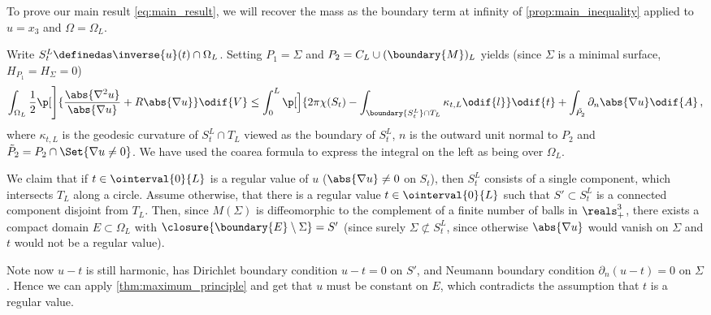 \documentclass[titlepage,numbers=noenddot,oneside,%
cleardoublepage=empty,paper=a4,fontsize=11pt,%
english,%
]{scrartcl}
\newcommand*{\mathcomma}{\,,}
\begin{document}
\newcommand{\nonzeroboundary}{\partial_{\neq 0}M^L}\newcommand{\maxu}{\bar{u}}
\newcommand{\minu}{\underline{u}}
To prove our main result \cref{eq:main_result}, we will recover the mass as the boundary term at infinity of \cref{prop:main_inequality} applied to \( u=x_3 \) and \( \Omega=\Omega_L \).


Write \( S_t^L\definedas \inverse{u}(t)\cap \Omega_L \). Setting \( P_1=\Sigma\) and \( P_2=C_L\cup (\boundary{M})_L \) yields (since \( \Sigma \) is a minimal surface, \ie \( H_{P_1}=H_\Sigma=0 \))
\begin{equation}
    \int_{\Omega_L} \frac{1}{2}\p[\Bigg]{\frac{\abs{\nabla^2 u}}{\abs{\nabla u}}+R\abs{\nabla u} }\odif{V} \leq\int_{0}^{L}\p[\Big]{2\pi \chi(S_t)-\int _{\boundary{S_t^L} \cap T_L}\kappa_{t,L}\odif{l}}\odif{t}+ \int_{\tilde{P_2}}\partial_{n} \abs{\nabla u}\odif{A}\mathcomma\label{eq:just_insert_cylinder_into_main_inequality}
\end{equation}
where \( \kappa_{t,L} \) is the geodesic curvature of \( S_{t}^L \cap T_L\) viewed as the boundary of \( S_t^L \), \( n \) is the outward unit normal to \( P_2 \) and \( \tilde{P}_2=P_2\cap \Set{\nabla u\neq 0} \). We have used the coarea formula to express the integral on the left as being over \( \Omega_L \).

We claim that if \( t\in \ointerval{0}{L} \) is a regular value of \( u \) (\ie \( \abs{\nabla u}\neq 0 \) on \( S_t \)), then \( S_t^L \) consists of a single component, which intersects \( T_L \) along a circle. Assume otherwise, \ie that there is a regular value \( t\in \ointerval{0}{L} \) such that \( S'\subset S_t^L \) is a connected component disjoint from \( T_L \). Then, since \( M(\Sigma) \) is diffeomorphic to the complement of a finite number of balls in \( \reals^3_+ \), there exists a compact domain \( E\subset \Omega_L \) with \( \closure{\boundary{E}\setminus \Sigma}=S' \) (since surely \( \Sigma\not\subset S_t^L \), since otherwise \( \abs{\nabla u} \) would vanish on \( \Sigma \) and \( t \) would not be a regular value).

Note now \( u-t \) is still harmonic, has Dirichlet boundary condition \( u-t=0 \) on \( S' \), and Neumann boundary condition \( \partial_n (u-t)=0 \) on \( \Sigma \). Hence we can apply \cref{thm:maximum_principle} and get that \( u \) must be constant on \( E \), which contradicts the assumption that \( t \) is a regular value.
\end{document}
